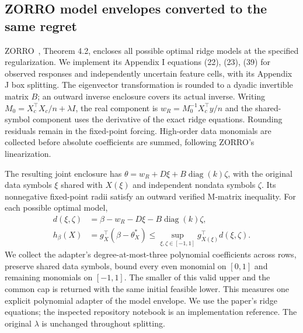 \subsection{ZORRO model envelopes converted to the same regret}
ZORRO~\citep{zhu2024zorro}, Theorem 4.2, encloses all possible optimal ridge models at the specified regularization. We implement its Appendix I equations (22), (23), (39) for observed responses and independently uncertain feature cells, with its Appendix J box splitting. The eigenvector transformation is rounded to a dyadic invertible matrix $B$; an outward inverse enclosure covers its actual inverse. Writing $M_0=X_c^\top X_c/n+\lambda I$, the real component is $w_R=M_0^{-1}X_c^\top y/n$ and the shared-symbol component uses the derivative of the exact ridge equations. Rounding residuals remain in the fixed-point forcing. High-order data monomials are collected before absolute coefficients are summed, following ZORRO's linearization.

The resulting joint enclosure has $\theta=w_R+D\xi+B\operatorname{diag}(k)\zeta$, with the original data symbols $\xi$ shared with $X(\xi)$ and independent nondata symbols $\zeta$. Its nonnegative fixed-point radii satisfy an outward verified M-matrix inequality. For each possible optimal model,
\begin{align*}
 d(\xi,\zeta)&=\beta-w_R-D\xi-B\operatorname{diag}(k)\zeta,\\
 h_\beta(X)&=g_X^\top(\beta-\theta_X^*)
 \le\sup_{\xi,\zeta\in[-1,1]}g_{X(\xi)}^\top d(\xi,\zeta).
\end{align*}
We collect the adapter's degree-at-most-three polynomial coefficients across rows, preserve shared data symbols, bound every even monomial on $[0,1]$ and remaining monomials on $[-1,1]$. The smaller of this valid upper and the common cap is returned with the same initial feasible lower. This measures one explicit polynomial adapter of the model envelope. We use the paper's ridge equations; the inspected repository notebook is an implementation reference. The original $\lambda$ is unchanged throughout splitting.

